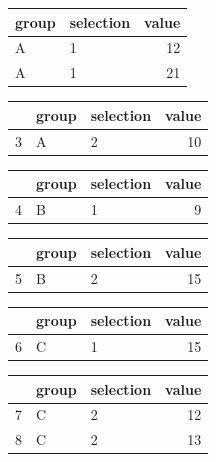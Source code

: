 \documentclass[
]{book}
\theoremstyle{definition}
\theoremstyle{definition}
\theoremstyle{definition}
\theoremstyle{definition}
\theoremstyle{remark}
\begin{document}
\begin{table}
\begin{table}
\centering
\begin{tabular}{l|l|r}
\hline
group & selection & value\\
\hline
A & 1 & 12\\
\hline
A & 1 & 21\\
\hline
\end{tabular}
\end{table}\begin{table}
\centering
\begin{tabular}{l|l|l|r}
\hline
  & group & selection & value\\
\hline
3 & A & 2 & 10\\
\hline
\end{tabular}
\end{table}
\end{table}\begin{table}
\begin{table}
\centering
\begin{tabular}{l|l|l|r}
\hline
  & group & selection & value\\
\hline
4 & B & 1 & 9\\
\hline
\end{tabular}
\end{table}\begin{table}
\centering
\begin{tabular}{l|l|l|r}
\hline
  & group & selection & value\\
\hline
5 & B & 2 & 15\\
\hline
\end{tabular}
\end{table}
\end{table}\begin{table}
\begin{table}
\centering
\begin{tabular}{l|l|l|r}
\hline
  & group & selection & value\\
\hline
6 & C & 1 & 15\\
\hline
\end{tabular}
\end{table}\begin{table}
\centering
\begin{tabular}{l|l|l|r}
\hline
  & group & selection & value\\
\hline
7 & C & 2 & 12\\
\hline
8 & C & 2 & 13\\
\hline
\end{tabular}
\end{table}
\end{table}
\end{document}

